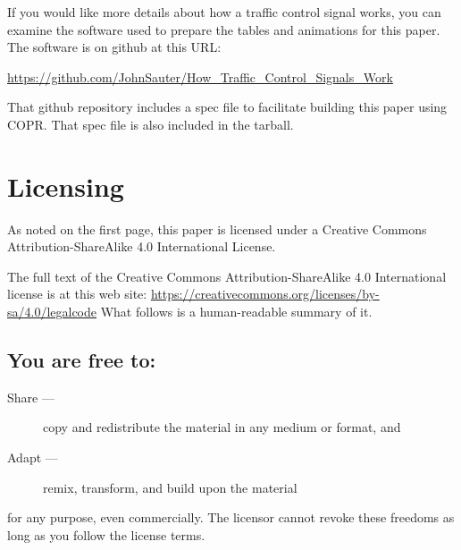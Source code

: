 \documentclass[letterpaper,twoside]{article}
\begin{document}
If you would like more details about how a traffic control signal works,
you can examine the software used to prepare the tables and animations
for this paper.  The software is on github at this URL:

\href{https://github.com/JohnSauter/How\_Traffic\_Control\_Signals\_Work}{https://github.com/JohnSauter/How\_Traffic\_Control\_Signals\_Work}

That github repository includes a spec file to facilitate building
this paper using COPR.  That spec file is also included in the tarball.

\section{Licensing}
\label{section:Licensing}
As noted on the first page, this paper is licensed under a Creative
Commons Attribution-ShareAlike 4.0 International License.

The full text of the Creative Commons Attribution-ShareAlike 4.0
International license is at this web site:
\href{https://creativecommons.org/licenses/by-sa/4.0/legalcode}{https://creativecommons.org/licenses/by-sa/4.0/legalcode}
What follows is a human-readable summary of it.

\subsection{You are free to:}
\begin{description}
\item[Share ---]copy and redistribute the material in any medium or format, and
\item[Adapt ---]remix, transform, and build upon the material
\end{description}
for any purpose, even commercially.  The licensor cannot revoke these
freedoms as long as you follow the license terms.
\end{document}
